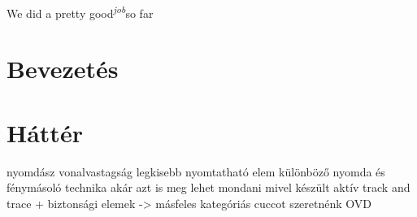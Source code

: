 
\DeclarePairedDelimiter{\norm}{\lVert}{\rVert}


\newcommand{\sumn}[1]{\sum\limits_{{#1}=1}^{n}}




%
%
%
%






We did a pretty good\textsuperscript{\textit{job}}so far

\section{Bevezetés}
\section{Háttér}




nyomdász
vonalvastagság
legkisebb nyomtatható elem
különböző nyomda és fénymásoló technika
akár azt is meg lehet mondani mivel készült
aktív track and trace + biztonsági elemek
-> másfeles kategóriás cuccot szeretnénk
OVD


